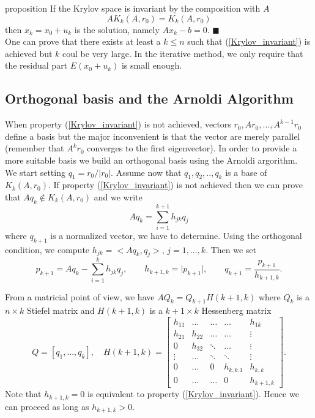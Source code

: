 \documentclass[12pt,a4 paper]{article}
\begin{document}
{\sc proposition}
If the Krylov space is invariant by the composition with $A$
\begin{equation}
AK_k(A,r_0) = K_k(A,r_0) \label{Krylov_invariant}
\end{equation}
 then $x_k=x_0+u_k$ is the solution, namely $Ax_k-b=0$.
$\blacksquare$\\

One can prove that there exists at least a $k\leq n$ such that  (\ref{Krylov_invariant}) is achieved but $k$ coul be very large. 
In the iterative method, we only require that the residual part $E(x_0+u_{k})$ is small enough.

\subsection{Orthogonal basis and the Arnoldi Algorithm}
When property (\ref{Krylov_invariant}) is not achieved, vectors $r_0,Ar_0,...,A^{k-1}r_0$ define a basis but the major inconvenient
is that the vector are merely parallel (remember that $A^k r_0$ converges to the first eigenvector). In order to provide a more
suitable basis we build an orthogonal basis using the Arnoldi argorithm.\\

We start setting $q_1=r_0/\vert r_0\vert$. Assume now that $q_1,q_2,..,q_k$ is a base of $K_k(A,r_0)$. 
If  property (\ref{Krylov_invariant}) is not achieved then we can prove that $Aq_k\notin K_k(A,r_0)$ and we write
$$
A q_k=\sum_{i=1}^{k+1} h_{jk} q_j
$$
where $q_{k+1}$ is a normalized vector, we have to determine. Using the orthogonal condition, we compute $h_{jk}=<Aq_k,q_j>$, $j=1,...,k$.
Then we set 
$$
p_{k+1}=Aq_k-\sum_{i=1}^k h_{jk} q_j, \qquad h_{k+1,k}=\vert p_{k+1}\vert, \qquad q_{k+1}=\frac{p_{k+1}}{h_{k+1,k}}.
$$

From a matricial point of view, we have $AQ_k=Q_{k+1}H(k+1,k)$ where $Q_k$ is a $n\times k$ Stiefel matrix and $H(k+1,k)$ is a $k+1\times k$
Hessenberg matrix 
$$
Q=[q_1,...,q_k], \quad H(k+1,k)=\left [ \begin{array}{ccccc}
h_{11} & \hdots & \hdots &\hdots   &h_{1k}\\
h_{21} & h_{22} & \hdots &\hdots   & \vdots \\
0      & h_{32} & \ddots &\hdots   & \vdots \\
\vdots & \hdots & \ddots &\ddots   & \vdots \\
0      & \hdots &  0     &h_{k,k.1}&h_{k,k} \\
0      & \hdots & \hdots &   0     &h_{k+1,k} 
\end{array} \right ].
$$
Note that  $h_{k+1,k}=0$ is equivalent to property (\ref{Krylov_invariant}). Hence we can proceed as long as  $h_{k+1,k}>0$. 
\end{document}
